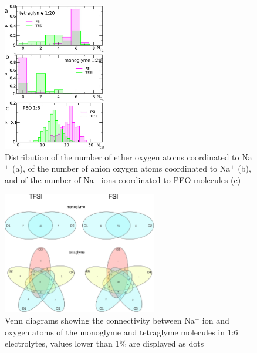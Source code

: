 \begin{figure}[H]
    \centering
    \includegraphics[width=0.4\textwidth]{img/3-structural-data-from-md-simulations/5-peo-na/histograms-chosen.png}
    \caption{Distribution of the number of ether oxygen atoms coordinated to Na$^{+}$ (a), of the number of anion oxygen atoms coordinated to Na$^{+}$ (b), and of the number of Na$^{+}$ ions coordinated to PEO molecules (c)}
    \label{fig:peo-na-histograms-chosen}
\end{figure}

\begin{figure}[ht]
    \centering
    \includegraphics[width=0.6\textwidth]{img/3-structural-data-from-md-simulations/5-peo-na/venn.png}
    \singlespacing
    \caption{Venn diagrams showing the connectivity between Na$^{+}$ ion and oxygen atoms of the monoglyme and tetraglyme molecules in 1:6 electrolytes, values lower than 1\% are displayed as dots}
    \label{fig:peo-na-venn}
\end{figure}

